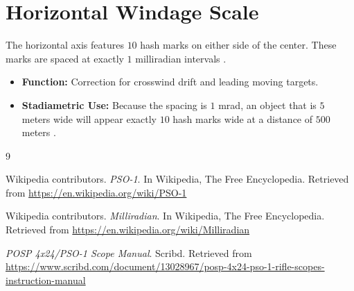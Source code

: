 \documentclass[11pt,a4paper]{article}
\begin{document}
\section{Horizontal Windage Scale}
The horizontal axis features $10$ hash marks on either side of the center. These marks are spaced at exactly $1$ milliradian intervals \cite{wiki:pso1}. 
\begin{itemize}
    \item \textbf{Function:} Correction for crosswind drift and leading moving targets.
    \item \textbf{Stadiametric Use:} Because the spacing is $1$ mrad, an object that is $5$ meters wide will appear exactly $10$ hash marks wide at a distance of $500$ meters \cite{wiki:pso1}.
\end{itemize}

\begin{thebibliography}{9}

Wikipedia contributors. \textit{PSO-1}. In Wikipedia, The Free Encyclopedia. Retrieved from \url{https://en.wikipedia.org/wiki/PSO-1}

Wikipedia contributors. \textit{Milliradian}. In Wikipedia, The Free Encyclopedia. Retrieved from \url{https://en.wikipedia.org/wiki/Milliradian}

\textit{POSP 4x24/PSO-1 Scope Manual}. Scribd. Retrieved from \url{https://www.scribd.com/document/13028967/posp-4x24-pso-1-rifle-scopes-instruction-manual}

\end{thebibliography}
\end{document}
